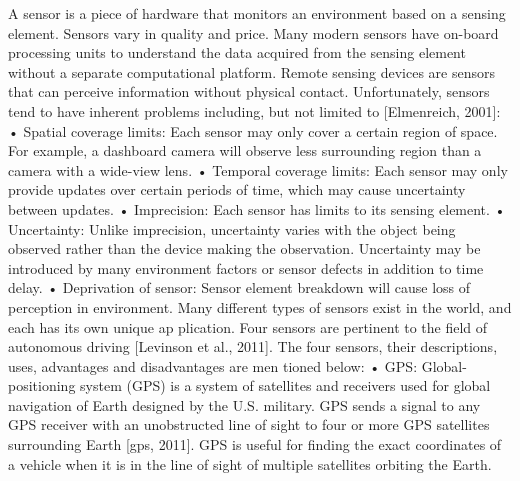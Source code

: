 A sensor is a piece of hardware that monitors an environment based on a sensing
element. Sensors vary in quality and price. Many modern sensors have on-board
processing units to understand the data acquired from the sensing element without
a separate computational platform. Remote sensing devices are sensors that can perceive information without physical contact. Unfortunately, sensors tend to have
inherent problems including, but not limited to [Elmenreich, 2001]:
• Spatial coverage limits: Each sensor may only cover a certain region of space. For example, a dashboard camera will observe less surrounding region than a
camera with a wide-view lens.
• Temporal coverage limits: Each sensor may only provide updates over certain periods of time, which may cause uncertainty between updates.
• Imprecision: Each sensor has limits to its sensing element. • Uncertainty: Unlike imprecision, uncertainty varies with the object being observed rather than the device making the observation. Uncertainty may be
introduced by many environment factors or sensor defects in addition to time
delay.
• Deprivation of sensor: Sensor element breakdown will cause loss of perception in environment.
Many diﬀerent types of sensors exist in the world, and each has its own unique ap
plication. Four sensors are pertinent to the ﬁeld of autonomous driving [Levinson et al., 2011].
The four sensors, their descriptions, uses, advantages and disadvantages are men
tioned below:
• GPS: Global-positioning system (GPS) is a system of satellites and receivers used for global navigation of Earth designed by the U.S. military. GPS sends a
signal to any GPS receiver with an unobstructed line of sight to four or more
GPS satellites surrounding Earth [gps, 2011]. GPS is useful for ﬁnding the
exact coordinates of a vehicle when it is in the line of sight of multiple satellites
orbiting the Earth.

